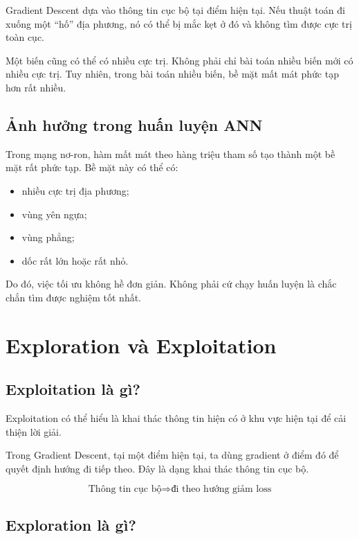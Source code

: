 Gradient Descent dựa vào thông tin cục bộ tại điểm hiện tại. Nếu thuật toán đi xuống một ``hố'' địa phương, nó có thể bị mắc kẹt ở đó và không tìm được cực trị toàn cục.

\begin{luuy}
Một biến cũng có thể có nhiều cực trị. Không phải chỉ bài toán nhiều biến mới có nhiều cực trị. Tuy nhiên, trong bài toán nhiều biến, bề mặt mất mát phức tạp hơn rất nhiều.
\end{luuy}

\subsection{Ảnh hưởng trong huấn luyện ANN}

Trong mạng nơ-ron, hàm mất mát theo hàng triệu tham số tạo thành một bề mặt rất phức tạp. Bề mặt này có thể có:

\begin{itemize}
    \item nhiều cực trị địa phương;
    \item vùng yên ngựa;
    \item vùng phẳng;
    \item dốc rất lớn hoặc rất nhỏ.
\end{itemize}

Do đó, việc tối ưu không hề đơn giản. Không phải cứ chạy huấn luyện là chắc chắn tìm được nghiệm tốt nhất.

\section{Exploration và Exploitation}

\subsection{Exploitation là gì?}

Exploitation có thể hiểu là khai thác thông tin hiện có ở khu vực hiện tại để cải thiện lời giải.

Trong Gradient Descent, tại một điểm hiện tại, ta dùng gradient ở điểm đó để quyết định hướng đi tiếp theo. Đây là dạng khai thác thông tin cục bộ.

\[
    \text{Thông tin cục bộ} \Rightarrow \text{đi theo hướng giảm loss}
\]

\subsection{Exploration là gì?}

